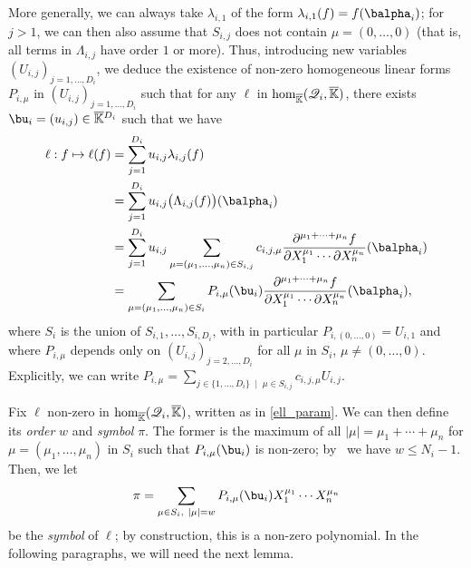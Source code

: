 \documentclass[12pt]{article}
\newcommand{\residueI}{\mathscr{Q}}
\def\Kbar {{\ensuremath{\overline{\mathbb{K}}}}}
\begin{document}
More generally, we can always take $\lambda_{i,1}$ of the form
$\lambda_{i,1}(f) = f(\balpha_i)$; for $j>1$, we can then also assume
that $S_{i,j}$ does not contain $\mu=(0,\dots,0)$ (that is, all terms
in $\Lambda_{i,j}$ have order $1$ or more). Thus, introducing new
variables $(U_{i,j})_{j =1,\dots,D_i}$, we deduce the existence of
non-zero homogeneous linear forms $P_{i,\mu}$ in
$(U_{i,j})_{j=1,\dots,D_i}$ such that for any $\ell$ in ${\rm
	hom}_\Kbar(\residueI_i,\Kbar)$, there exists $\bu_i=(u_{i,j}) \in
\Kbar{}^{D_i}$ such that we have
\begin{align}\label{ell_param}
\ell: f \mapsto \ell(f)
&= \sum_{j=1}^{D_i} u_{i,j} \lambda_{i,j}(f)\nonumber\\
&= \sum_{j=1}^{D_i} u_{i,j} \big(\Lambda_{i,j}(f)\big)(\balpha_i)\nonumber\\
&= \sum_{j=1}^{D_i} u_{i,j}
\sum_{\mu=(\mu_1,\dots,\mu_n) \in
	S_{i,j}} c_{i,j,\mu} \frac{ \partial^{\mu_1 + \cdots + \mu_n} f}
{\partial X_1^{\mu_1} \cdots \partial X_n^{\mu_n}}(\balpha_i)\nonumber\\
&= \sum_{\mu=(\mu_1,\dots,\mu_n) \in S_i} P_{i,\mu}(\bu_i)
\frac{ \partial^{\mu_1 + \cdots + \mu_n} f}
{\partial X_1^{\mu_1} \cdots \partial X_n^{\mu_n}}(\balpha_i),
\end{align}
where $S_i$ is  the union of $S_{i,1},\dots,S_{i,D_i}$,
with in particular $P_{i,(0,\dots,0)}=U_{i,1}$ and where $P_{i,\mu}$
depends only on $(U_{i,j})_{j =2,\dots,D_i}$ for all $\mu$ in $S_i$,
$\mu \ne (0,\dots,0)$. Explicitly, we can write $P_{i,\mu}=\sum_{j\in
	\{1,\dots,D_i\} \;\mid\; \mu \in S_{i,j}} c_{i,j,\mu}
U_{i,j}$. 

Fix $\ell$ non-zero in ${\rm hom}_\Kbar(\residueI_i,\Kbar)$, written
as in \cref{ell_param}. We can then
define its {\em order} $w$ and {\em symbol} $\pi$. The former is
the maximum of all $|\mu|=\mu_1+\cdots+\mu_n$ for
$\mu=(\mu_1,\dots,\mu_n)$ in $S_i$ such that $P_{i,\mu}(\bu_i)$ is
non-zero; by~\cite[Lemma~3.3]{Mourrain97} we have $w \le
N_i-1$. Then, we let
$$\pi =\sum_{\mu \in S_i,\ |\mu|=w}P_{i,\mu}(\bu_i) X_1^{\mu_1} \cdots
X_n^{\mu_n}$$ be the {\em symbol} of $\ell$; by construction,
this is a non-zero polynomial. In the following paragraphs, we will
need the next lemma.
\end{document}
